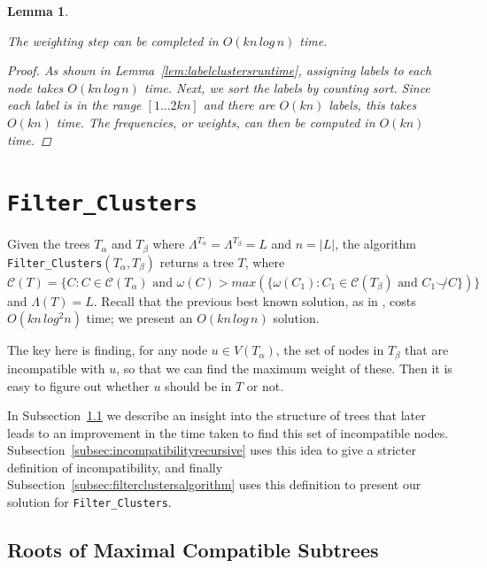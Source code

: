 \documentclass{article}
\newcommand{\compatible}{\smile}
\newcommand{\leafset}{\Lambda}
\newcommand{\weight}{\omega}
\newcommand{\TA}{T_\alpha}
\newcommand{\TB}{T_\beta}
\newtheorem{weightingruntime}[incompatibility]{Lemma}
\begin{document}
    \medskip
    \begin{weightingruntime}
        \label{lem:weightingruntime}

        The weighting step can be completed in $O(kn\,log\,n)$ time.

        \begin{proof}
            As shown in Lemma~\ref{lem:labelclustersruntime}, assigning labels to each node takes $O(kn\,log\,n)$ time. Next, we sort the labels by counting sort. Since each label is in the range $[1 ... 2kn]$ and there are $O(kn)$ labels, this takes $O(kn)$ time. The frequencies, or weights, can then be computed in $O(kn)$ time.
        \end{proof}
    \end{weightingruntime}

    \section{\texttt{Filter\_Clusters}}
    \label{sec:filterclusters}

    Given the trees $\TA$ and $\TB$ where $\leafset^{\TA} = \leafset^{\TB} = L$ and $n = |L|$, the algorithm \texttt{Filter\_Clusters}$(\TA, \TB)$ returns a tree $T$, where $\mathcal{C}(T) = \{C : C \in \mathcal{C}(\TA) \text{ and } \weight(C) > max(\{\weight(C_1) : C_1 \in \mathcal{C}(\TB) \text{ and } C_1 \not\compatible C\})\}$ and $\leafset(T) = L$. Recall that the previous best known solution, as in \cite{jansson2018algorithms}, costs $O(kn\,log^2n)$ time; we present an $O(kn\,log\,n)$ solution.

    The key here is finding, for any node $u \in V(\TA)$, the set of nodes in $\TB$ that are incompatible with $u$, so that we can find the maximum weight of these. Then it is easy to figure out whether $u$ should be in $T$ or not.

    In Subsection~\ref{subsec:rootsofsubtrees} we describe an insight into the structure of trees that later leads to an improvement in the time taken to find this set of incompatible nodes. Subsection~\ref{subsec:incompatibilityrecursive} uses this idea to give a stricter definition of incompatibility, and finally Subsection~\ref{subsec:filterclustersalgorithm} uses this definition to present our solution for \texttt{Filter\_Clusters}.

    \subsection{Roots of Maximal Compatible Subtrees}
    \label{subsec:rootsofsubtrees}
\end{document}
